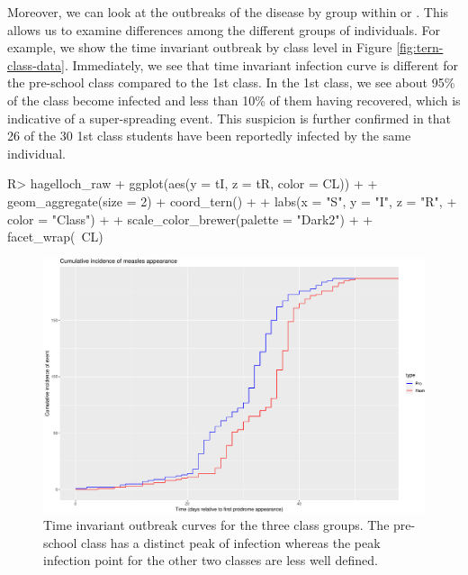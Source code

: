 \documentclass[
  shortnames]{jss}
\begin{document}
Moreover, we can look at the outbreaks of the disease by group within
 or . This allows us
to examine differences among the different groups of individuals. For
example, we show the time invariant outbreak by class level in Figure
\ref{fig:tern-class-data}. Immediately, we see that time invariant
infection curve is different for the pre-school class compared to the
1st class. In the 1st class, we see about 95\% of the class become
infected and less than 10\% of them having recovered, which is
indicative of a super-spreading event. This suspicion is further
confirmed in that 26 of the 30 1st class students have been reportedly
infected by the same individual.

\begin{CodeChunk}
\begin{CodeInput}
R> hagelloch_raw %
+   ggplot(aes(y = tI, z = tR, color = CL)) +
+   geom_aggregate(size = 2) + coord_tern() +
+   labs(x = "S", y = "I", z = "R",
+        color = "Class") +
+   scale_color_brewer(palette = "Dark2") +
+   facet_wrap(~CL)
\end{CodeInput}
\begin{figure}[H]

{\centering \includegraphics{Figs/unnamed-chunk-10-1} 

}

\caption{\label{fig:tern-class-data}Time invariant outbreak curves for the three class groups.  The pre-school class has a distinct peak of infection whereas the peak infection point for the other two classes are less well defined.}\label{fig:unnamed-chunk-10}
\end{figure}
\end{CodeChunk}
\end{document}
